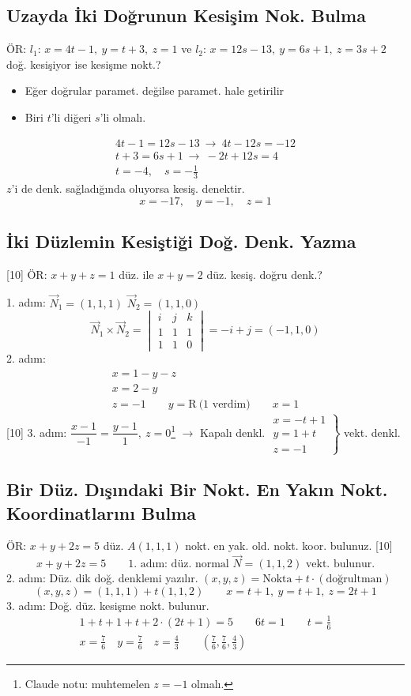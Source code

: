 \documentclass[11pt,a4paper]{article}
\begin{document}
\subsection{Uzayda İki Doğrunun Kesişim Nok. Bulma}
ÖR: $l_1$: $x=4t-1,\ y=t+3,\ z=1$ \quad ve \quad $l_2$: $x=12s-13,\ y=6s+1,\ z=3s+2$ doğ. kesişiyor ise kesişme nokt.?
\begin{itemize}[nosep]
\item Eğer doğrular paramet. değilse paramet. hale getirilir
\item Biri $t$'li diğeri $s$'li olmalı.
\end{itemize}
\begin{gather*}
4t-1=12s-13\ \to\ 4t-12s=-12\\
t+3=6s+1\ \to\ -2t+12s=4\\
t=-4,\quad s=-\frac13
\end{gather*}
$z$'i de denk. sağladığında oluyorsa kesiş. denektir.
\[ x=-17,\quad y=-1,\quad z=1 \]

\subsection{İki Düzlemin Kesiştiği Doğ. Denk. Yazma}
[10]
ÖR: $x+y+z=1$ düz. ile $x+y=2$ düz. kesiş. doğru denk.?

1. adım: $\vec N_1=(1,1,1)$ \quad $\vec N_2=(1,1,0)$
\[ \vec N_1\times\vec N_2=\begin{vmatrix}i&j&k\\1&1&1\\1&1&0\end{vmatrix}=-i+j=(-1,1,0) \]
2. adım:
\begin{gather*}
x=1-y-z\\
x=2-y\\
z=-1\qquad y=\mathrm{R}\ \text{(1 verdim)}\qquad x=1
\end{gather*}
[10]
3. adım: $\dfrac{x-1}{-1}=\dfrac{y-1}{1},\ z=0$\footnote{Claude notu: muhtemelen $z=-1$ olmalı.} $\to$ Kapalı denkl. \qquad $\left.\begin{array}{l}x=-t+1\\ y=1+t\\ z=-1\end{array}\right\}$ vekt. denkl.

\subsection{Bir Düz. Dışındaki Bir Nokt. En Yakın Nokt. Koordinatlarını Bulma}
ÖR: $x+y+2z=5$ düz. $A(1,1,1)$ nokt. en yak. old. nokt. koor. bulunuz.
[10]
\[ x+y+2z=5\qquad \text{1. adım: düz. normal }\vec N=(1,1,2)\text{ vekt. bulunur.} \]
2. adım: Düz. dik doğ. denklemi yazılır. $(x,y,z)=\text{Nokta}+t\cdot(\text{doğrultman})$
\[ (x,y,z)=(1,1,1)+t(1,1,2)\qquad x=t+1,\ y=t+1,\ z=2t+1 \]
3. adım: Doğ. düz. kesişme nokt. bulunur.
\begin{gather*}
1+t+1+t+2\cdot(2t+1)=5\qquad 6t=1\qquad t=\frac16\\
x=\frac76\quad y=\frac76\quad z=\frac43\qquad \left(\frac76,\frac76,\frac43\right)
\end{gather*}
\end{document}
